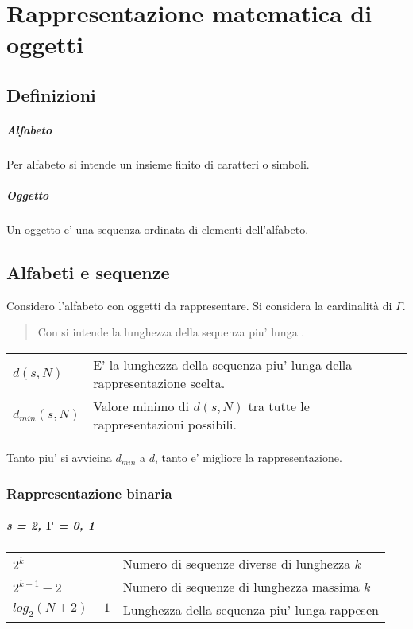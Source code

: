 \chapter{Rappresentazione matematica di oggetti}
\section{Definizioni}
\paragraph{Alfabeto} Per alfabeto si intende un insieme finito di caratteri o simboli.
\paragraph{Oggetto} Un oggetto e' una sequenza ordinata di elementi dell'alfabeto.
\section{Alfabeti e sequenze}
Considero l'alfabeto \redtext{$\Gamma$} con  oggetti da rappresentare.
Si considera  la cardinalità di $\Gamma$.
\begin{quote}
    Con  si intende la lunghezza della sequenza piu' lunga .
\end{quote}
\begin{tabular}{l l}
    \textbf{$d(s, N)$} & E' la lunghezza della sequenza piu' lunga della rappresentazione scelta.\\
    \textbf{$d_{min}(s, N)$} & Valore minimo di $d(s, N)$ tra tutte le rappresentazioni possibili.
\end{tabular}
Tanto piu' si avvicina $d_{min}$ a $d$, tanto e' migliore la rappresentazione.
\subsection{Rappresentazione binaria}
\paragraph{s = 2, $\mathbf{\Gamma}$ = {0, 1}}
\begin{tabular}{l l}
    $2^k$ & Numero di sequenze diverse di lunghezza $k$\\
    $2^{k+1} - 2$ & Numero di sequenze di lunghezza massima $k$\\
    $log_2(N+2)-1$ & Lunghezza della sequenza piu' lunga rappesen
\end{tabular}
